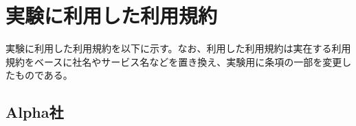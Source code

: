 \appendix
\chapter{実験に利用した利用規約}
実験に利用した利用規約を以下に示す。なお、利用した利用規約は実在する利用規約をベースに社名やサービス名などを置き換え、実験用に条項の一部を変更したものである。

\section{Alpha社}
